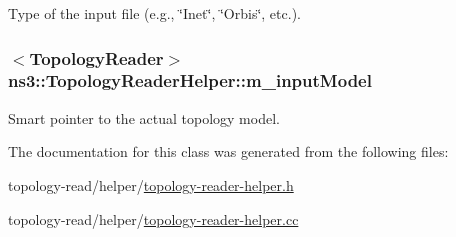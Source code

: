 Type of the input file (e.\+g., \char`\"{}\+Inet\char`\"{}, \char`\"{}\+Orbis\char`\"{}, etc.). 

\subsubsection[{\texorpdfstring{m\+\_\+input\+Model}{m_inputModel}}]{$<${\bf Topology\+Reader}$>$ ns3\+::\+Topology\+Reader\+Helper\+::m\+\_\+input\+Model\hspace{0.3cm}{\ttfamily [private]}}\hypertarget{classns3_1_1TopologyReaderHelper_a76fd4470b46a9a872048f502ee231de8}{}\label{classns3_1_1TopologyReaderHelper_a76fd4470b46a9a872048f502ee231de8}


Smart pointer to the actual topology model. 



The documentation for this class was generated from the following files\+:\begin{DoxyCompactItemize}
\item 
topology-\/read/helper/\hyperlink{topology-reader-helper_8h}{topology-\/reader-\/helper.\+h}\item 
topology-\/read/helper/\hyperlink{topology-reader-helper_8cc}{topology-\/reader-\/helper.\+cc}\end{DoxyCompactItemize}
